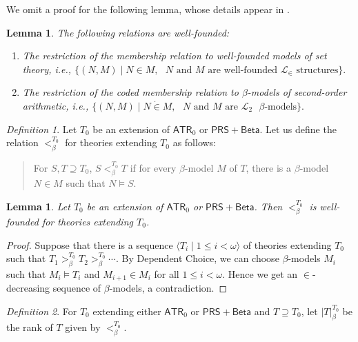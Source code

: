 \documentclass{amsart}
\newtheorem{lemma}[theorem]{Lemma}
\theoremstyle{remark}
\newtheorem{definition}[definition]{Definition}
\newcommand{\PRS}{\mathsf{PRS}}
\newcommand{\Beta}{\mathsf{Beta}}
\newcommand{\ATR}{\mathsf{ATR}}
\begin{document}
We omit a proof for the following lemma, whose details appear in \cite{mummert2004incompleteness, lutz2020incompleteness}. 
\begin{lemma} \label{Lemma: Membership bw beta models is wellfounded} \pushQED{\qed}
    The following relations are well-founded:
    \begin{enumerate}
        \item The restriction of the membership relation to well-founded models of set theory, i.e., $\{ (N,M) \mid N\in M, \text{ $N$ and $M$ are well-founded $\mathcal{L}_\in$ structures} \}.$
        \item The restriction of the coded membership relation to $\beta$-models of second-order arithmetic, i.e., $\{ (N,M) \mid N\dot\in M, \text{ $N$ and $M$ are $\mathcal{L}_2$ $\beta$-models} \}.$ \qedhere 
    \end{enumerate}
\end{lemma}

\begin{definition}
    Let $T_0$ be an extension of $\ATR_0$ or $\PRS+\Beta$. Let us define the relation $<^{T_0}_\beta$ for theories extending $T_0$ as follows: 
    \begin{quote}
        For $S,T\supseteq T_0$, $S<^{T_0}_\beta T$ if for every $\beta$-model $M$ of $T$, there is a $\beta$-model $N\in M$ such that $N\vDash S$.
    \end{quote}
\end{definition}

\begin{lemma}
    Let $T_0$ be an extension of $\ATR_0$ or $\PRS+\Beta$. Then $<^{T_0}_\beta$ is well-founded for theories extending $T_0$.
\end{lemma}
\begin{proof}
    Suppose that there is a sequence $\langle T_i \mid 1\le i<\omega\rangle$ of theories extending $T_0$ such that $T_1>^{T_0}_\beta T_2 >^{T_0}_\beta \cdots$. By Dependent Choice, we can choose $\beta$-models $M_i$ such that $M_i\vDash T_i$ and $M_{i+1}\in M_i$ for all $1\le i<\omega$. Hence we get an $\in$-decreasing sequence of $\beta$-models, a contradiction.
\end{proof}

\begin{definition}
    For $T_0$ extending either $\ATR_0$ or $\PRS+\Beta$ and $T\supseteq T_0$, let $|T|_\beta^{T_0}$ be the rank of $T$ given by $<^{T_0}_{\beta}$.
\end{definition}
\end{document}
